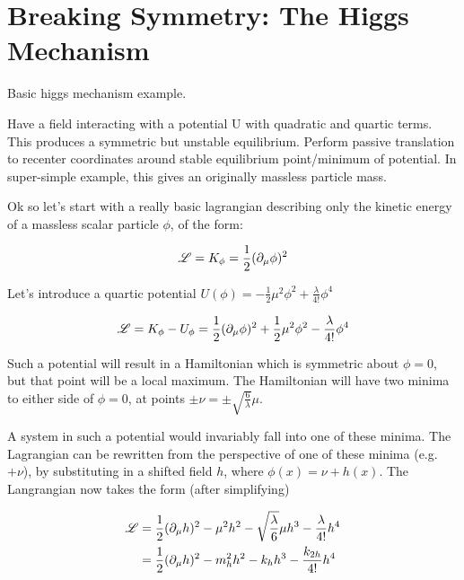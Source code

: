\section{Breaking Symmetry: The Higgs Mechanism}\label{sec:higgs_mechanism}

    Basic higgs mechanism example.

    Have a field interacting with a potential U with quadratic and quartic terms.
    This produces a symmetric but unstable equilibrium.
    Perform passive translation to recenter coordinates around stable equilibrium point/minimum of potential.
    In super-simple example, this gives an originally massless particle mass.

    Ok so let's start with a really basic lagrangian describing only the kinetic energy of a massless scalar particle $\phi$, of the form:

    \begin{equation}
        \mathscr{L} = K_{\phi} = \frac{1}{2} (\partial_{\mu} \phi)^2
    \end{equation}

    Let's introduce a quartic potential $U(\phi) = -\frac{1}{2} \mu^2 \phi^2 + \frac{\lambda}{4!} \phi^4$

    \begin{equation}
        \mathscr{L} = K_{\phi} - U_{\phi} = \frac{1}{2} (\partial_{\mu} \phi)^2 
            +\frac{1}{2} \mu^2 \phi^2 - \frac{\lambda}{4!} \phi^4
    \end{equation}

    Such a potential will result in a Hamiltonian which is symmetric about $\phi=0$, but that point will be a local maximum.%
    The Hamiltonian will have two minima to either side of $\phi=0$, at points $\pm \nu = \pm \sqrt{\frac{6}{\lambda}} \mu$.

    A system in such a potential would invariably fall into one of these minima.
    The Lagrangian can be rewritten from the perspective of one of these minima (e.g.\ $+\nu$),
        by substituting in a shifted field $h$, where $\phi(x)=\nu+h(x)$.
    The Langrangian now takes the form (after simplifying)

    \begin{equation} \begin{split} \label{eq:basic_higgs}
        \mathscr{L} & = \frac{1}{2} (\partial_{\mu} h)^2
            - \mu^2 h^2
            -\sqrt{\frac{\lambda}{6}} \mu h^3
            - \frac{\lambda}{4!} h^4 \\
         & = \frac{1}{2} (\partial_{\mu} h)^2
            - m^2_{h} h^2
            - k_{h} h^3
            - \frac{k_{2h}}{4!} h^4
    \end{split} \end{equation} %

